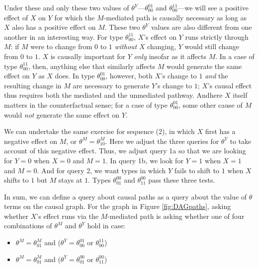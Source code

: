 \documentclass[12pt,]{book}
\providecommand{\tightlist}{%
  \setlength{\itemsep}{0pt}\setlength{\parskip}{0pt}}
\begin{document}
Under these and only these two values of \(\theta^Y\)---\(\theta_{00}^{01}\) and \(\theta_{00}^{11}\)---we will see a positive effect of \(X\) on \(Y\) for which the \(M\)-mediated path is causally necessary as long as \(X\) also has a positive effect on \(M\). These two \(\theta^Y\) values are also different from one another in an interesting way. For type \(\theta_{00}^{11}\), \(X\)'s effect on \(Y\) runs strictly through \(M\): if \(M\) were to change from \(0\) to \(1\) \emph{without} \(X\) changing, \(Y\) would still change from \(0\) to \(1\). \(X\) is causally important for \(Y\) \emph{only} insofar as it affects \(M\). In a case of type \(\theta_{00}^{11}\), then, anything else that similarly affects \(M\) would generate the same effect on \(Y\) as \(X\) does. In type \(\theta_{00}^{01}\), however, both \(X\)'s change to \(1\) \emph{and} the resulting change in \(M\) are necessary to generate \(Y\)'s change to \(1\); \(X\)'s causal effect thus requires both the mediated and the unmediated pathway. Andhere \(X\) itself matters in the counterfactual sense; for a case of type \(\theta_{00}^{01}\), some other cause of \(M\) would \emph{not} generate the same effect on \(Y\).

We can undertake the same exercise for sequence (2), in which \(X\) first has a negative effect on \(M\), or \(\theta^M=\theta^M_{10}\). Here we adjust the three queries for \(\theta^Y\) to take account of this negative effect. Thus, we adjust query 1a so that we are looking for \(Y=0\) when \(X=0\) and \(M=1\). In query 1b, we look for \(Y=1\) when \(X=1\) and \(M=0\). And for query 2, we want types in which \(Y\) fails to shift to \(1\) when \(X\) shifts to \(1\) but \(M\) stays at \(1\). Types \(\theta_{01}^{00}\) and \(\theta_{11}^{00}\) pass these three tests.

In sum, we can define a query about causal paths as a query about the value of \(\theta\) terms on the causal graph. For the graph in Figure \ref{fig:DAGpaths}, asking whether \(X\)'s effect runs via the \(M\)-mediated path is asking whether one of four combinations of \(\theta^M\) and \(\theta^Y\) hold in case:

\begin{itemize}
\tightlist
\item
  \(\theta^M=\theta^M_{01}\) and (\(\theta^Y=\theta_{00}^{01}\) or \(\theta_{00}^{11}\))
\item
  \(\theta^M=\theta^M_{01}\) and (\(\theta^Y=\theta_{01}^{00}\) or \(\theta_{11}^{00}\))
\end{itemize}
\end{document}
